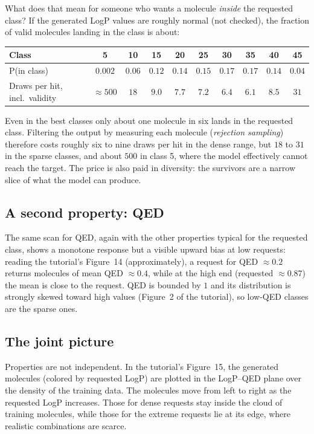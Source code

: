 \documentclass[11pt]{article}
\begin{document}
What does that mean for someone who wants a molecule \emph{inside} the requested class? If the generated LogP values are roughly normal (not checked), the fraction of valid molecules landing in the class is about:

\begin{center}
\small
\begin{tabular}{@{}lccccccccc@{}}
\toprule
Class & 5 & 10 & 15 & 20 & 25 & 30 & 35 & 40 & 45\\
\midrule
P(in class) & $0.002$ & $0.06$ & $0.12$ & $0.14$ & $0.15$ & $0.17$ & $0.17$ & $0.14$ & $0.04$\\
Draws per hit, incl.\ validity & $\approx500$ & $18$ & $9.0$ & $7.7$ & $7.2$ & $6.4$ & $6.1$ & $8.5$ & $31$\\
\bottomrule
\end{tabular}
\end{center}

Even in the best classes only about one molecule in six lands in the requested class. Filtering the output by measuring each molecule (\emph{rejection sampling}) therefore costs roughly six to nine draws per hit in the dense range, but $18$ to $31$ in the sparse classes, and about $500$ in class 5, where the model effectively cannot reach the target. The price is also paid in diversity: the survivors are a narrow slice of what the model can produce.

\subsection*{A second property: QED}
The same scan for QED, again with the other properties typical for the requested class, shows a monotone response but a visible upward bias at low requests: reading the tutorial's Figure~14 (approximately), a request for QED $\approx0.2$ returns molecules of mean QED $\approx0.4$, while at the high end (requested $\approx0.87$) the mean is close to the request. QED is bounded by $1$ and its distribution is strongly skewed toward high values (Figure~2 of the tutorial), so low-QED classes are the sparse ones.

\subsection*{The joint picture}
Properties are not independent. In the tutorial's Figure~15, the generated molecules (colored by requested LogP) are plotted in the LogP--QED plane over the density of the training data. The molecules move from left to right as the requested LogP increases. Those for dense requests stay inside the cloud of training molecules, while those for the extreme requests lie at its edge, where realistic combinations are scarce.
\end{document}
